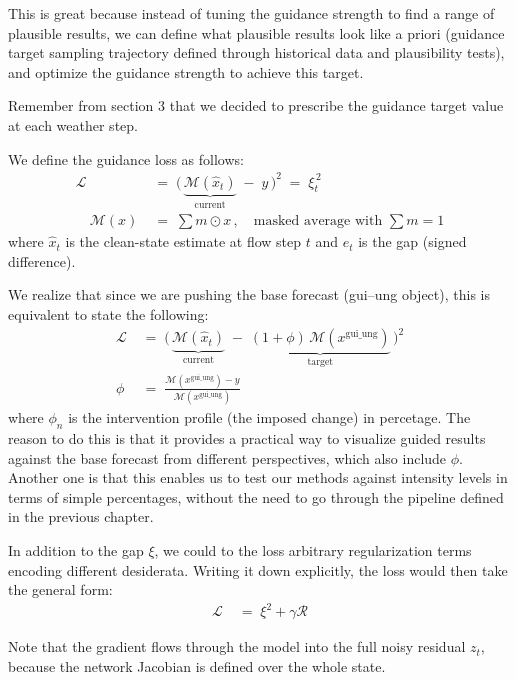 This is great because instead of tuning the guidance strength to find a range of plausible results, we can define what plausible results look like a priori (guidance target sampling trajectory defined through historical data and plausibility tests), and optimize the guidance strength to achieve this target. 

Remember from section 3 that we decided to prescribe the guidance target value at each weather step.

We define the guidance loss as follows:
\begin{align*}
    \mathcal{L}    &\;=\; \Big(\, \underbrace{\mathcal{M}(\hat{x}_t)}_{\text{current}}
        \;-\; y \,\Big)^{2}
        \;=\; \xi_t^{\,2} \\
    \quad \mathcal{M}(x) &\;=\; \sum m \odot x\, ,
    \quad \text{masked average with } \sum m = 1
\end{align*}
where $\hat{x}_t$ is the clean-state estimate at flow step $t$ and $e_t$ is the gap (signed difference).

We realize that since we are pushing the base forecast (gui--ung object), this is equivalent to state the following:
\begin{align*}
    \mathcal{L}
        &\;=\; \Big(\, \underbrace{\mathcal{M}(\hat{x}_t)}_{\text{current}}
        \;-\; \underbrace{(1+\phi)\,\mathcal{M}(x^{\text{gui\_ung}})}_{\text{target}} \,\Big)^{2} \\
        \phi &\;=\; \frac{\mathcal{M}(x^{\text{gui\_ung}})-y}{\mathcal{M}(x^{\text{gui\_ung}})} 
\end{align*}
where  $\phi_n$ is the intervention profile (the imposed change) in percetage.
The reason to do this is that it provides a practical way to visualize guided results against the base forecast from different perspectives, which also include $\phi$.
Another one is that this enables us to test our methods against intensity levels in terms of simple percentages, without the need to go through the pipeline defined in the previous chapter.

In addition to the gap $\xi$, we could to the loss arbitrary regularization terms encoding different desiderata. 
Writing it down explicitly, the loss would then take the general form:
\begin{align*}
    \mathcal{L} &\;=\; \xi^2 + \gamma \mathcal{R}
\end{align*}


Note that the gradient flows through the model into the full noisy residual $z_t$, because the network Jacobian is defined over the whole state.

